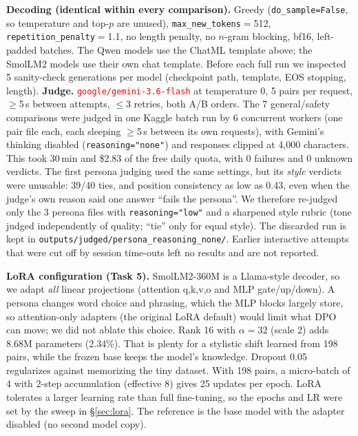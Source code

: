\documentclass[10pt]{article}
\newcommand{\res}[1]{\textcolor{red}{#1}}
\providecommand{\JudgeModel}{\res{\texttt{google/gemini-3.6-flash}}}
\newcommand{\code}[1]{\texttt{\small #1}}
\begin{document}
\textbf{Decoding (identical within every comparison).} Greedy (\code{do\_sample=False}, so temperature and top-$p$ are
unused), \code{max\_new\_tokens}$=$512, \code{repetition\_penalty}$=$1.1, no length penalty, no $n$-gram blocking, bf16, left-padded
batches. The Qwen models use the ChatML template above; the SmolLM2 models use their own chat template.
Before each full run we inspected 5 sanity-check generations per model (checkpoint path, template, EOS stopping, length).
\textbf{Judge.} \JudgeModel{} at temperature 0, 5 pairs per request, $\ge$5\,s between attempts,
$\le$3 retries, both A/B orders. The 7 general/safety comparisons were judged in one Kaggle batch run by 6 concurrent workers (one
pair file each, each sleeping $\ge$5\,s between its own requests), with Gemini's thinking disabled
(\code{reasoning="none"}) and responses clipped at 4{,}000 characters. This took 30\,min and \$2.83 of the free daily quota, with
0 failures and 0 unknown verdicts. The first persona judging used the same settings, but its \emph{style} verdicts were
unusable: 39/40 ties, and position consistency as low as 0.43, even when the judge's own reason said one answer ``fails the
persona''. We therefore re-judged only the 3 persona files with \code{reasoning="low"} and a sharpened style rubric (tone
judged independently of quality; ``tie'' only for equal style). The discarded run is kept in
\code{outputs/judged/persona\_reasoning\_none/}. Earlier interactive attempts that were cut off by session time-outs left no results
and are not reported.

\textbf{LoRA configuration (Task 5).} SmolLM2-360M is a Llama-style decoder, so we adapt \emph{all} linear projections
(attention q,k,v,o and MLP gate/up/down). A persona changes word choice and phrasing, which the MLP blocks largely store, so
attention-only adapters (the original LoRA default) would limit what DPO can move; we did not ablate this choice. Rank 16 with $\alpha{=}32$
(scale 2) adds 8.68M parameters (2.34\%). That is plenty for a stylistic shift learned from 198 pairs, while the frozen
base keeps the model's knowledge. Dropout 0.05 regularizes against memorizing the tiny dataset. With 198 pairs, a
micro-batch of 4 with 2-step accumulation (effective 8) gives 25 updates per epoch. LoRA tolerates a larger learning
rate than full fine-tuning, so the epochs and LR were set by the sweep in \S\ref{sec:lora}. The reference is the base
model with the adapter disabled (no second model copy).

\end{document}
